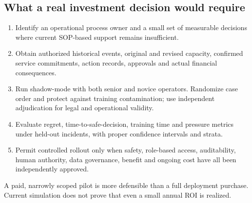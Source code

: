 \documentclass[10pt,a4paper]{article}
\theoremstyle{definition}\newtheorem{definition}[theorem]{Definition}
\theoremstyle{remark}\newtheorem{remark}[theorem]{Remark}
\newcommand{\1}{\mathbbm 1}
\begin{document}
\subsection{What a real investment decision would require}
\begin{enumerate}
\item Identify an operational process owner and a small set of measurable decisions where current SOP-based support remains insufficient.
\item Obtain authorized historical events, original and revised capacity, confirmed service commitments, action records, approvals and actual financial consequences.
\item Run shadow-mode with both senior and novice operators. Randomize case order and protect against training contamination; use independent adjudication for legal and operational validity.
\item Evaluate regret, time-to-safe-decision, training time and pressure metrics under held-out incidents, with proper confidence intervals and strata.
\item Permit controlled rollout only when safety, role-based access, auditability, human authority, data governance, benefit and ongoing cost have all been independently approved.
\end{enumerate}
A paid, narrowly scoped pilot is more defensible than a full deployment purchase. Current simulation does not prove that even a small annual ROI is realized.
\end{document}
